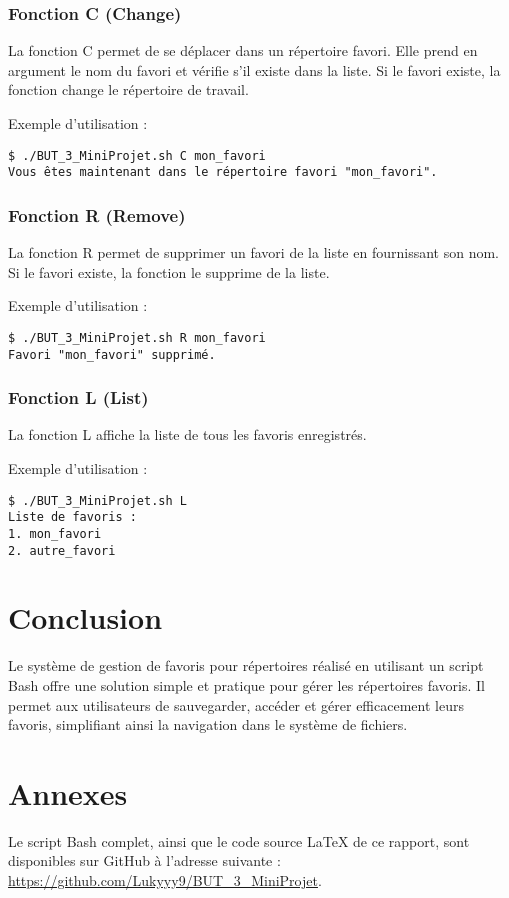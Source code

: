\documentclass[a4paper, 12pt]{article}
\begin{document}
\subsubsection{Fonction C (Change)}
La fonction C permet de se déplacer dans un répertoire favori. Elle prend en argument le nom du favori et vérifie s'il existe dans la liste. Si le favori existe, la fonction change le répertoire de travail.

Exemple d'utilisation :
\begin{lstlisting}[style=mystyle]
$ ./BUT_3_MiniProjet.sh C mon_favori
Vous êtes maintenant dans le répertoire favori "mon_favori".
\end{lstlisting}

\subsubsection{Fonction R (Remove)}
La fonction R permet de supprimer un favori de la liste en fournissant son nom. Si le favori existe, la fonction le supprime de la liste.

Exemple d'utilisation :
\begin{lstlisting}[style=mystyle]
$ ./BUT_3_MiniProjet.sh R mon_favori
Favori "mon_favori" supprimé.
\end{lstlisting}

\subsubsection{Fonction L (List)}
La fonction L affiche la liste de tous les favoris enregistrés.

Exemple d'utilisation :
\begin{lstlisting}[style=mystyle]
$ ./BUT_3_MiniProjet.sh L
Liste de favoris :
1. mon_favori
2. autre_favori
\end{lstlisting}

\section{Conclusion}
Le système de gestion de favoris pour répertoires réalisé en utilisant un script Bash offre une solution simple et pratique pour gérer les répertoires favoris. Il permet aux utilisateurs de sauvegarder, accéder et gérer efficacement leurs favoris, simplifiant ainsi la navigation dans le système de fichiers.

\section{Annexes}
Le script Bash complet, ainsi que le code source LaTeX de ce rapport, sont disponibles sur GitHub à l'adresse suivante : \url{https://github.com/Lukyyy9/BUT_3_MiniProjet}.
\end{document}
